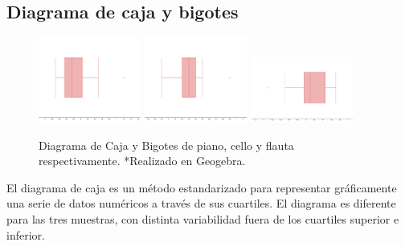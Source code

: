\subsection{Diagrama de caja y bigotes}
\begin{center}
    \begin{figure}[H]
        \centering
        \includegraphics[width=0.3\textwidth]{./appendages/DBP.png}
        \includegraphics[width=0.3\textwidth]{./appendages/DBC.png}
        \includegraphics[width=0.3\textwidth]{./appendages/DBF.png}
        \caption{Diagrama de Caja y Bigotes de piano, cello y flauta respectivamente. *Realizado en Geogebra.}
    \end{figure}
\end{center}
El diagrama de caja es un método estandarizado para representar gráficamente una serie de datos numéricos a través de sus cuartiles. El diagrama es diferente para las tres muestras, con distinta variabilidad fuera de los cuartiles superior e inferior.

